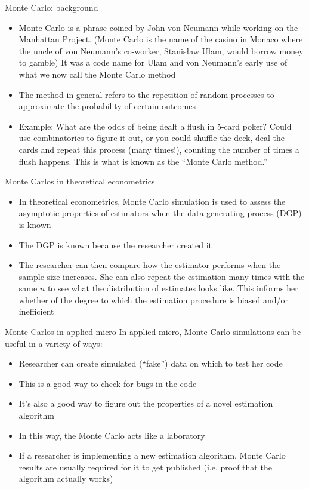 \documentclass[english,xcolor=dvipsnames]{beamer}
\begin{document}
\begin{frame}{Monte Carlo: background}
\begin{itemize}
	\item Monte Carlo is a phrase coined by John von Neumann while working on the Manhattan Project. (Monte Carlo is the name of the casino in Monaco where the uncle of von Neumann's co-worker, Stanis{\l}aw Ulam, would borrow money to gamble) It was a code name for Ulam and von Neumann's early use of what we now call the Monte Carlo method
	\item The method in general refers to the repetition of random processes to approximate the probability of certain outcomes
	\item Example: What are the odds of being dealt a flush in 5-card poker? Could use combinatorics to figure it out, or you could shuffle the deck, deal the cards and repeat this process (many times!), counting the number of times a flush happens. This is what is known as the ``Monte Carlo method.''
\end{itemize}
\end{frame}

\begin{frame}{Monte Carlos in theoretical econometrics}
\begin{itemize}
	\item In theoretical econometrics, Monte Carlo simulation is used to assess the asymptotic properties of estimators when the data generating process (DGP) is known
	\item The DGP is known because the researcher created it
	\item The researcher can then compare how the estimator performs when the sample size increases. She can also repeat the estimation many times with the same $n$ to see what the distribution of estimates looks like. This informs her whether of the degree to which the estimation procedure is biased and/or inefficient
\end{itemize}
\end{frame}

\begin{frame}{Monte Carlos in applied micro}
In applied micro, Monte Carlo simulations can be useful in a variety of ways:
\begin{itemize}
	\item Researcher can create simulated (``fake'') data on which to test her code
  \item This is a good way to check for bugs in the code
  \item It's also a good way to figure out the properties of a novel estimation algorithm
	\item In this way, the Monte Carlo acts like a laboratory
	\item If a researcher is implementing a new estimation algorithm, Monte Carlo results are usually required for it to get published (i.e. proof that the algorithm actually works)
\end{itemize}
\end{frame}
\end{document}
